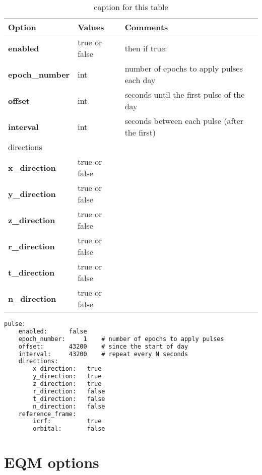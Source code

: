 \begin{table}[h!]
	\begin{tabular}{|p{4.5cm}|p{2cm}|p{3.5cm}|}
		\hline
		Option & Values & Comments \\
		\hline
		\textbf{enabled} & true or false & then if true: \\
		\hline
		\textbf{epoch\_number} & int & number of epochs to apply pulses each day \\
		\textbf{offset} & int & seconds until the first pulse of the day \\
		\textbf{interval} & int & seconds between each pulse (after the first)\\
		\hline
		directions & & \\
		\textbf{x\_direction} &  true or false &  \\
		\textbf{y\_direction} &  true or false &  \\
		\textbf{z\_direction} &  true or false &  \\
		\textbf{r\_direction} &  true or false &  \\
		\textbf{t\_direction} &  true or false &  \\
		\textbf{n\_direction} &  true or false &  \\
\hline
	\end{tabular}
	\caption{caption for this table}
	\label{table:label_name}
\end{table}
%
{\small
	\begin{lstlisting}[language=xml,caption=yaml example for gravitational force model options]
   pulse:
	enabled:      false
	epoch_number:     1    # number of epochs to apply pulses
	offset:       43200    # since the start of day
	interval:     43200    # repeat every N seconds
	directions:
		x_direction:   true
		y_direction:   true
		z_direction:   true
		r_direction:   false
		t_direction:   false
		n_direction:   false
	reference_frame:
		icrf:          true
		orbital:       false
	\end{lstlisting}
}
%
\section{EQM options}
%
